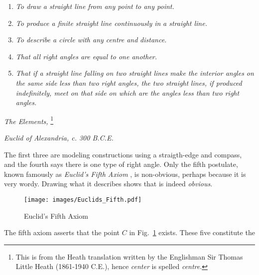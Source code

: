         \begin{center}
            \begin{enumerate}
                \item \textit{To draw a straight line from any point}
                      \textit{to any point.}
                \item \textit{To produce a finite straight line continuously in}
                      \textit{a straight line.}
                \item \textit{To describe a circle with any centre and}
                      \textit{distance.}
                \item \textit{That all right angles are equal to one another.}
                \item \textit{That if a straight line falling on two straight}
                      \textit{lines make the interior angles on the same side}
                      \textit{less than two right angles, the two straight}
                      \textit{lines, if produced indefinitely, meet on that}
                      \textit{side on which are the angles less than two right}
                      \textit{angles.}
            \end{enumerate}
            \hfill\textit{The Elements,}%
            \footnote{%
                This is from the Heath translation written by the Englishman
                Sir Thomas Little Heath
                (1861-1940 C.E.), hence \textit{center} is spelled
                \textit{centre}.
            }\par
            \hfill\textit{Euclid of Alexandria, c. 300 B.C.E.}
        \end{center}
        The first three are modeling constructions using a straigth-edge and
        compass, and the fourth says there is one type of right angle. Only the
        fifth postulate, known famously as \textit{Euclid's Fifth Axiom}%
        , is non-obvious, perhaps because it is very
        wordy. Drawing what it describes shows that is indeed \textit{obvious}.
        \begin{figure}
            \centering
            \captionsetup{type=figure}
            \texttt{[image: images/Euclids\_Fifth.pdf]}
            \caption{Euclid's Fifth Axiom}
            \label{fig:Euclids_Fifth_Axiom}
        \end{figure}
        The fifth axiom asserts that the point $C$ in
        Fig.~\ref{fig:Euclids_Fifth_Axiom} exists. These five constitute the
